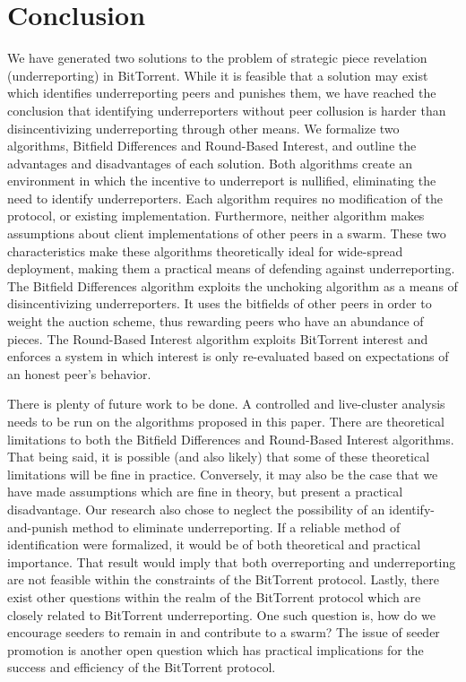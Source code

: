 \section{Conclusion}

We have generated two solutions to the problem of strategic piece revelation (underreporting) in BitTorrent. While it is feasible that a solution may exist which identifies underreporting peers and punishes them, we have reached the conclusion that identifying underreporters without peer collusion is harder than disincentivizing underreporting through other means. We formalize two algorithms, Bitfield Differences and Round-Based Interest, and outline the advantages and disadvantages of each solution. Both algorithms create an environment in which the incentive to underreport is nullified, eliminating the need to identify underreporters. Each algorithm requires no modification of the protocol, or existing implementation. Furthermore, neither algorithm makes assumptions about client implementations of other peers in a swarm. These two characteristics make these algorithms theoretically ideal for wide-spread deployment, making them a practical means of defending against underreporting. The Bitfield Differences algorithm exploits the unchoking algorithm as a means of disincentivizing underreporters. It uses the bitfields of other peers in order to weight the auction scheme, thus rewarding peers who have an abundance of pieces. The Round-Based Interest algorithm exploits BitTorrent interest and enforces a system in which interest is only re-evaluated based on expectations of an honest peer's behavior.

There is plenty of future work to be done. A controlled and live-cluster analysis needs to be run on the algorithms proposed in this paper. There are theoretical limitations to both the Bitfield Differences and Round-Based Interest algorithms. That being said, it is possible (and also likely) that some of these theoretical limitations will be fine in practice. Conversely, it may also be the case that we have made assumptions which are fine in theory, but present a practical disadvantage. Our research also chose to neglect the possibility of an identify-and-punish method to eliminate underreporting. If a reliable method of identification were formalized, it would be of both theoretical and practical importance. That result would imply that both overreporting and underreporting are not feasible within the constraints of the BitTorrent protocol. Lastly, there exist other questions within the realm of the BitTorrent protocol which are closely related to BitTorrent underreporting. One such question is, how do we encourage seeders to remain in and contribute to a swarm? The issue of seeder promotion is another open question which has practical implications for the success and efficiency of the BitTorrent protocol.
